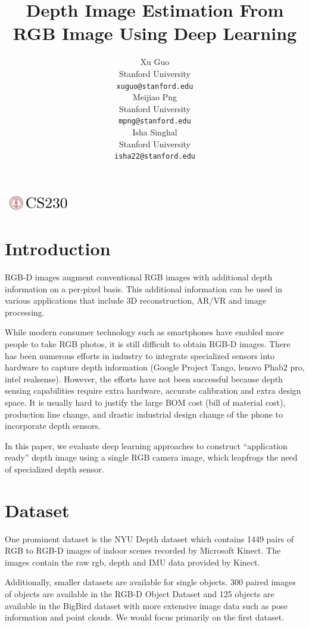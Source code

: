 \documentclass{article}
\title{Depth Image Estimation From RGB Image Using Deep Learning}
\author{
  Xu Guo\\
  Stanford University\\
  \texttt{xuguo@stanford.edu} \\
  \And
  Meijiao Png\\
  Stanford University\\
  \texttt{mpng@stanford.edu} \\
  \And
  Isha Singhal\\
  Stanford University\\
  \texttt{isha22@stanford.edu} \\
}
\begin{document}

\begin{center}
\includegraphics[width=3cm, height=0.7cm]{CS230}
\end{center}

\maketitle

\section{Introduction}	
RGB-D images augment conventional RGB images with additional depth information on a per-pixel basis. This additional information can be used in various applications that include 3D reconstruction, AR/VR and image processing.  

While modern consumer technology such as smartphones have enabled more people to take RGB photos, it is still difficult to obtain RGB-D images. There has been numerous efforts in industry to integrate specialized sensors into hardware to capture depth information (Google Project Tango, lenovo Phab2 pro, intel realsense). However, the efforts have not been successful because depth sensing capabilities require extra hardware, accurate calibration and extra design space. It is usually hard to justify the large BOM cost (bill of material cost), production line change, and drastic industrial design change of the phone to incorporate depth sensors.

In this paper, we evaluate deep learning approaches to construct “application ready” depth image using a single RGB camera image, which leapfrogs the need of specialized depth sensor.


\section{Dataset}
One prominent dataset is the NYU Depth dataset \cite{nyu_dataset} which contains 1449 pairs of RGB to RGB-D images of indoor scenes recorded by Microsoft Kinect. The images contain the raw rgb, depth and IMU data provided by Kinect. 

Additionally, smaller datasets are available for single objects. 300 paired images of objects are available in the RGB-D Object Dataset \cite{uw_dataset} and 125 objects are available in the BigBird \cite{big_bird_dataset} dataset with more extensive image data such as pose information and point clouds. We would focus primarily on the first dataset.
\end{document}
